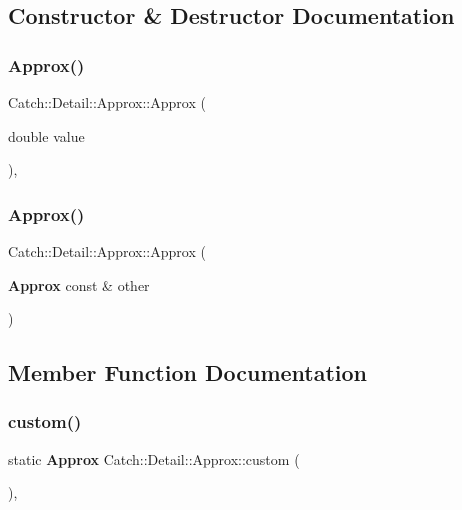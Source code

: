 \subsection{Constructor \& Destructor Documentation}
\mbox{\label{class_catch_1_1_detail_1_1_approx_a1a8618ea8db08c66bd3d9fe8f74b957a}} 
\subsubsection{Approx()\hspace{0.1cm}{\footnotesize\ttfamily [1/2]}}
{\footnotesize\ttfamily Catch\+::\+Detail\+::\+Approx\+::\+Approx (\begin{DoxyParamCaption}\item[{double}]{value }\end{DoxyParamCaption})\hspace{0.3cm}{\ttfamily [inline]}, {\ttfamily [explicit]}}

\mbox{\label{class_catch_1_1_detail_1_1_approx_a807330c63266fc914abdf6e461255a54}} 
\subsubsection{Approx()\hspace{0.1cm}{\footnotesize\ttfamily [2/2]}}
{\footnotesize\ttfamily Catch\+::\+Detail\+::\+Approx\+::\+Approx (\begin{DoxyParamCaption}\item[{\textbf{ Approx} const \&}]{other }\end{DoxyParamCaption})\hspace{0.3cm}{\ttfamily [inline]}}



\subsection{Member Function Documentation}
\mbox{\label{class_catch_1_1_detail_1_1_approx_aaf86dc0ee92272ac2d9839197a07951d}} 
\subsubsection{custom()}
{\footnotesize\ttfamily static \textbf{ Approx} Catch\+::\+Detail\+::\+Approx\+::custom (\begin{DoxyParamCaption}{ }\end{DoxyParamCaption})\hspace{0.3cm}{\ttfamily [inline]}, {\ttfamily [static]}}

